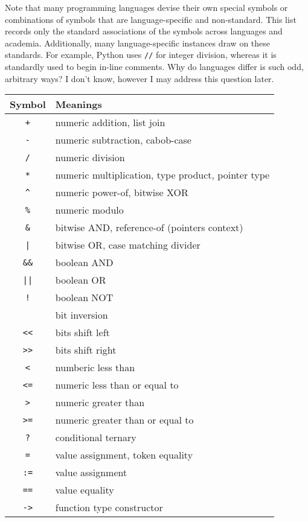 \documentclass{article}
\newcommand{\code}[1]{\texttt{#1}}
\begin{document}
	Note that many programming languages devise their own special symbols or combinations of symbols that are language-specific and non-standard. This list records only the standard associations of the symbols across languages and academia. Additionally, many language-specific instances draw on these standards. For example, Python uses \code{//} for integer division, whereas it is standardly used to begin in-line comments. Why do languages differ is such odd, arbitrary ways? I don't know, however I may address this question later.

	\vspace{20px}
	
	\begin{tabular}{c|l}
		Symbol  & Meanings \\ \hline
		\code{+} 	&numeric addition, list join \\
		\code{-} 	&numeric subtraction, cabob-case \\
		\code{/} 	&numeric division \\
		\code{*} 	&numeric multiplication, type product, pointer type \\
		\code{\textasciicircum} &numeric power-of, bitwise XOR \\
		\code{\%}   &numeric modulo \\
		\code{\&}   	&bitwise AND, reference-of (pointers context) \\
		\code{|}    	&bitwise OR, case matching divider \\
		\code{\&\&} 	&boolean AND \\
		\code{||}	&boolean OR \\
		\code{!} 		&boolean NOT\\
		\texttildelow & bit inversion \\
		\code{<<}	&bits shift left \\
		\code{>>}	&bits shift right \\
		\code{<}		&numberic less than \\
		\code{<=}	&numeric less than or equal to\\
		\code{>}		&numeric greater than \\
		\code{>=} 	&numeric greater than or equal to\\
		\code{?}		&conditional ternary \\
		\code{=}		&value assignment, token equality \\
		\code{:=}	&value assignment \\
		\code{==}	&value equality \\
		\code{->}	&function type constructor \\

\end{tabular}
\end{document}

